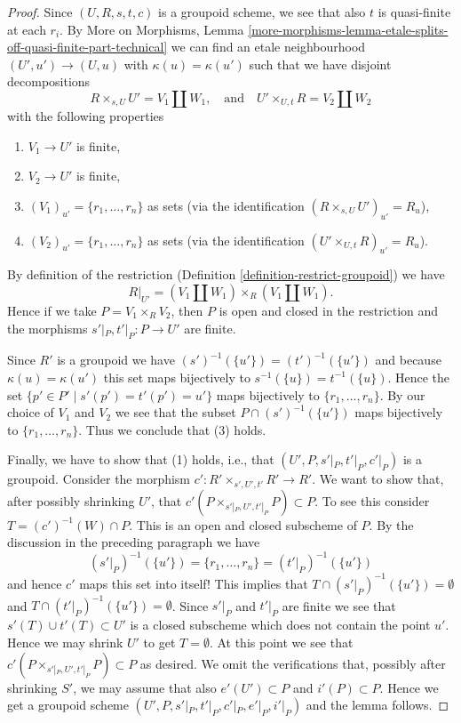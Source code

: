 \begin{proof}
Since $(U, R, s, t, c)$ is a groupoid scheme, we see that also
$t$ is quasi-finite at each $r_i$. By
More on Morphisms,
Lemma \ref{more-morphisms-lemma-etale-splits-off-quasi-finite-part-technical}
we can find an etale neighbourhood $(U', u') \to (U, u)$ with
$\kappa(u) = \kappa(u')$ such that we have disjoint decompositions
$$
R \times_{s, U} U' = V_1 \coprod W_1,
\quad\text{and}\quad
U' \times_{U, t} R = V_2 \coprod W_2
$$
with the following properties
\begin{enumerate}
\item $V_1 \to U'$ is finite,
\item $V_2 \to U'$ is finite,
\item $(V_1)_{u'} = \{r_1, \ldots, r_n\}$ as sets (via the identification
$(R \times_{s, U} U')_{u'} = R_u$),
\item $(V_2)_{u'} = \{r_1, \ldots, r_n\}$ as sets (via the identification
$(U' \times_{U, t} R)_{u'} = R_u$).
\end{enumerate}
By definition of the restriction
(Definition \ref{definition-restrict-groupoid})
we have
$$
R|_{U'} = (V_1 \coprod W_1) \times_R (V_1 \coprod W_1).
$$
Hence if we take $P = V_1 \times_R V_2$, then $P$ is open and closed
in the restriction and the morphisms $s'|_P, t'|_P : P \to U'$ are finite.

\medskip\noindent
Since $R'$ is a groupoid we have $(s')^{-1}(\{u'\}) = (t')^{-1}(\{u'\})$
and because $\kappa(u) = \kappa(u')$ this set maps bijectively to
$s^{-1}(\{u\}) = t^{-1}(\{u\})$. Hence the set
$\{p' \in P' \mid s'(p') = t'(p') = u'\}$
maps bijectively to $\{r_1, \ldots, r_n\}$.
By our choice of $V_1$ and $V_2$ we see that the subset
$P \cap (s')^{-1}(\{u'\})$ maps bijectively
to $\{r_1, \ldots, r_n\}$. Thus we conclude that (3) holds.

\medskip\noindent
Finally, we have to show that (1) holds, i.e., that
$(U', P, s'|_P, t'|_P, c'|_P)$ is a groupoid.
Consider the morphism $c' : R' \times_{s', U', t'} R' \to R'$.
We want to show that, after possibly shrinking $U'$, that
$c'(P \times_{s'|_P, U', t'|_P} P) \subset P$. To see this
consider $T = (c')^{-1}(W) \cap P$. This is an open and closed 
subscheme of $P$. By the discussion in the preceding paragraph
we have
$$
(s'|_P)^{-1}(\{u'\}) = \{r_1, \ldots, r_n\} = (t'|_P)^{-1}(\{u'\})
$$
and hence $c'$ maps this set into itself! This implies that
$T \cap (s'|_P)^{-1}(\{u'\}) = \emptyset$ and
$T \cap (t'|_P)^{-1}(\{u'\}) = \emptyset$. Since $s'|_P$ and
$t'|_P$ are finite we see that $s'(T) \cup t'(T) \subset U'$
is a closed subscheme which does not contain the point $u'$.
Hence we may shrink $U'$ to get $T = \emptyset$. At this point
we see that $c'(P \times_{s'|_P, U', t'|_P} P) \subset P$
as desired. We omit the verifications that, possibly after shrinking $S'$,
we may assume that also $e'(U') \subset P$ and $i'(P) \subset P$.
Hence we get a groupoid scheme $(U', P, s'|_P, t'|_P, c'|_P, e'|_P, i'|_P)$
and the lemma follows.
\end{proof}













